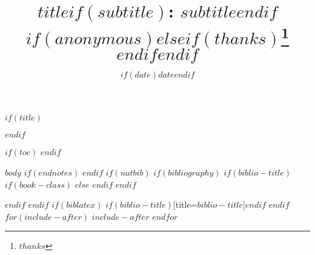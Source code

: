 \documentclass[$if(fontsize)$$fontsize$,$endif$$if(lang)$$babel-lang$,$endif$$if(papersize)$$papersize$,$endif$$for(classoption)$$classoption$$sep$,$endfor$]{article}
\title{$title$$if(subtitle)$: $subtitle$$endif$ $if(anonymous)$$else$$if(thanks)$\thanks{$thanks$} $endif$$endif$ }
\date{$if(date)$$date$$endif$}
\begin{document}
$if(title)$
\maketitle
$endif$

$if(toc)$
{
\hypersetup{linkcolor=black}
\setcounter{tocdepth}{$toc-depth$}
\tableofcontents
}
$endif$

$body$
$if(endnotes)$
\newpage
\theendnotes
$endif$
\newpage
\singlespacing
$if(natbib)$
$if(bibliography)$
$if(biblio-title)$
$if(book-class)$
\renewcommand\bibname{$biblio-title$}
$else$
\renewcommand\refname{$biblio-title$}
$endif$
$endif$

$endif$
$endif$
$if(biblatex)$
\printbibliography$if(biblio-title)$[title=$biblio-title$]$endif$
$endif$
$for(include-after)$
$include-after$
$endfor$
\end{document}
